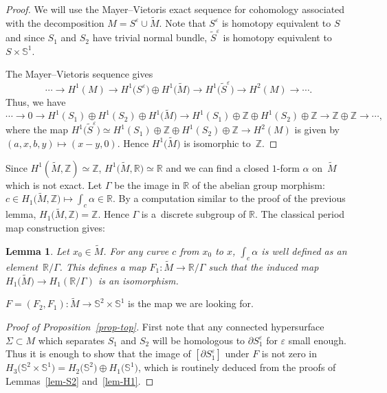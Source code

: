 \documentclass[pdftex]{sigma}
\numberwithin{equation}{section}
\newtheorem{lem}[thm]{Lemma}
\newcommand{\eps}{\varepsilon}
\begin{document}
\begin{proof}
 We will use the Mayer--Vietoris exact sequence for cohomology
 associated with the decomposition $M=S^\eps\cup \tilde M$. Note that
 $S^\eps$ is homotopy equivalent to $S$ and
 since $S_1$ and $S_2$ have trivial normal bundle, $\tilde
 S^\eps$ is homotopy equivalent to $S\times\mathbb{S}^1$.

 The Mayer--Vietoris sequence gives
 \[\cdots\to H^1(M)\to H^1\big(S^\eps\big)\oplus
 H^1\big(\tilde M\big) \to H^1\big(\tilde S^\eps\big)\to H^2(M)\to\cdots.\]
 Thus, we have
 \[\cdots\to 0\to H^1(S_1)\oplus H^1(S_2)\oplus
 H^1\big(\tilde M\big) \to H^1(S_1)\oplus\mathbb{Z}\oplus
 H^1(S_2)\oplus\mathbb{Z}\to \mathbb{Z}\oplus\mathbb{Z}\to\cdots,\]
 where the map $ H^1\big(\tilde S^\eps\big)\simeq H^1(S_1)\oplus\mathbb{Z}\oplus
 H^1(S_2)\oplus\mathbb{Z}\to H^2(M)$ is given by
 $(a,x,b,y)\mapsto (x-y,0)$. Hence $H^1\big(\tilde M\big)$ is isomorphic to~$\mathbb{Z}$.
\end{proof}

Since $H^1(\tilde M,\mathbb{Z})\simeq \mathbb{Z}$, $H^1\big(\tilde
M,\mathbb{R}\big)\simeq \mathbb{R}$ and we can find a closed $1$-form
$\alpha$ on~$\tilde M$ which is not exact. Let
$\Gamma$ be the image in $\mathbb{R}$ of the abelian group morphism:
$c\in H_1\big(\tilde M,\mathbb{Z}\big)\mapsto \int_c\alpha\in\mathbb{R}$. By a
computation similar to the proof of the previous lemma, $H_1\big(\tilde
M,\mathbb{Z}\big)=\mathbb{Z}$. Hence $\Gamma$ is a~discrete subgroup of $\mathbb{R}$. The
classical period map construction gives:
\begin{lem}\label{lem-S1}
 Let $x_0\in\tilde M$. For any curve $c$ from $x_0$ to $x$,
 $\int_c\alpha$ is well defined as an element~$\mathbb{R}/\Gamma$. This
 defines a map $F_1\colon \tilde M\to\mathbb{R}/\Gamma$ such that the induced map
 $H_1\big(\tilde M\big)\to H_1(\mathbb{R}/\Gamma) $ is an isomorphism.
\end{lem}

$F=(F_2,F_1)\colon \tilde M\to \mathbb{S}^2\times\mathbb{S}^1$ is the map we
are looking for.

\begin{proof}[Proof of Proposition~\ref{prop-top}]
First note that any connected hypersurface $\Sigma\subset M$ which separates $S_1$ and $S_2$
will be homologous to $\partial S_1^\eps$ for $\eps$ small
enough. Thus it is enough to show that the image of $[\partial
S_1^\eps]$ under $F$ is not zero in
$H_3\big(\mathbb{S}^2\times\mathbb{S}^1\big)=H_2\big(\mathbb{S}^2)\oplus
H_1(\mathbb{S}^1\big)$, which is routinely deduced from the proofs of
Lemmas~\ref{lem-S2} and~\ref{lem-H1}.
\end{proof}
\end{document}
